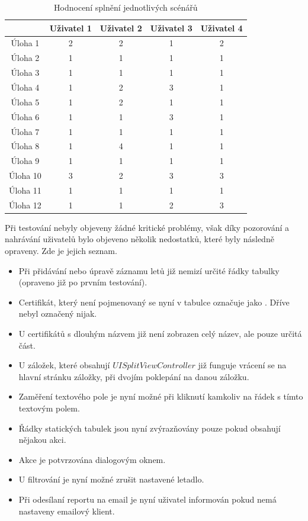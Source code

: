 \documentclass[thesis=M,czech]{FITthesis}[2012/06/26]
\begin{document}
\begin{table}\centering
 \begin{tabular}{ c | c | c | c | c |}
 	 & Uživatel 1 & Uživatel 2 & Uživatel 3 & Uživatel 4 \\
 	\hline
 	Úloha 1  & 2 & 2 & 1 & 2 \\
 	Úloha 2  & 1 & 1 & 1 & 1 \\
 	Úloha 3  & 1 & 1 & 1 & 1 \\
 	Úloha 4  & 1 & 2 & 3 & 1 \\
 	Úloha 5  & 1 & 2 & 1 & 1 \\
 	Úloha 6  & 1 & 1 & 3 & 1 \\
 	Úloha 7  & 1 & 1 & 1 & 1 \\
 	Úloha 8  & 1 & 4 & 1 & 1 \\
 	Úloha 9  & 1 & 1 & 1 & 1 \\
 	Úloha 10 & 3 & 2 & 3 & 3 \\
 	Úloha 11 & 1 & 1 & 1 & 1 \\
 	Úloha 12 & 1 & 1 & 2 & 3 \\
 \end{tabular}
 \caption[Hodnocení splnění jednotlivých scénářů]{Hodnocení splnění jednotlivých scénářů}\label{tab:ut_eval}
\end{table}

Při testování nebyly objeveny žádné kritické problémy, však díky pozorování a nahrávání uživatelů bylo objeveno několik nedostatků, které byly následně opraveny. Zde je jejich seznam.

\begin{itemize}
\item Při přidávání nebo úpravě záznamu letů již nemizí určité řádky tabulky (opraveno již po prvním testování).
\item Certifikát, který není pojmenovaný se nyní v tabulce označuje jako . Dříve nebyl označený nijak.
\item U certifikátů s dlouhým názvem již není zobrazen celý název, ale pouze určitá část.
\item U záložek, které obsahují $UISplitViewController$ již funguje vrácení se na hlavní stránku záložky, při dvojím poklepání na danou záložku.
\item Zaměření textového pole je nyní možné při kliknutí kamkoliv na řádek s tímto textovým polem.
\item Řádky statických tabulek jsou nyní zvýrazňovány pouze pokud obsahují nějakou akci.
\item Akce  je potvrzována dialogovým oknem.
\item U filtrování je nyní možné zrušit nastavené letadlo.
\item Při odesílaní reportu na email je nyní uživatel informován pokud nemá nastaveny emailový klient.
\end{itemize}
\end{document}
